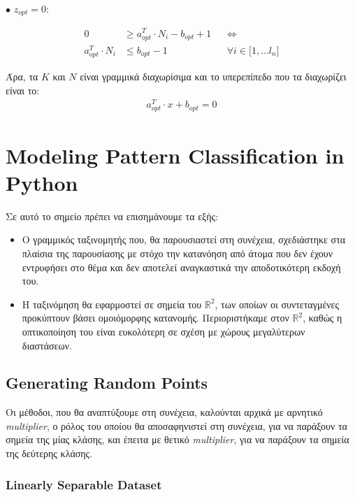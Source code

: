 \documentclass[12pt]{article}
\newcommand{\R}{\mathbb{R}}
\newcommand{\centered}[1]{\begin{align*}#1\end{align*}}
\begin{document}
\( \bullet \) \(z_{opt} = 0\):

\begin{align*}
0 & \geq a^{T}_{opt} \cdot N_{i} - b_{opt} + 1 && \Leftrightarrow \\ 
a^{T}_{opt} \cdot N_{i} & \leq b_{opt} - 1 && \forall i \in \lbrack 1, \dotsc l_n \rbrack
\end{align*} 

Άρα, τα \(K\) και \(N\) είναι γραμμικά διαχωρίσιμα και το υπερεπίπεδο που τα διαχωρίζει είναι το: \\

\centered{a^{T}_{opt} \cdot x + b_{opt} = 0}


\pagebreak

\section{Modeling Pattern Classification in Python}

Σε αυτό το σημείο πρέπει να επισημάνουμε τα εξής: \\

\begin{itemize}
    \item Ο γραμμικός ταξινομητής που, θα παρουσιαστεί στη συνέχεια,
    σχεδιάστηκε στα πλαίσια της παρουσίασης με στόχο την κατανόηση
    από άτομα που δεν έχουν εντρυφήσει στο θέμα και δεν αποτελεί αναγκαστικά
    την αποδοτικότερη εκδοχή του. \\

    \item Η ταξινόμηση θα εφαρμοστεί σε σημεία του \( \R^2 \),
    των οποίων οι συντεταγμένες προκύπτουν βάσει ομοιόμορφης κατανομής.
    Περιοριστήκαμε στον \( \R^2 \), καθώς η οπτικοποίηση του είναι ευκολότερη
    σε σχέση με χώρους μεγαλύτερων διαστάσεων. \\
\end{itemize}

\subsection{Generating Random Points}

Οι μέθοδοι, που θα αναπτύξουμε στη συνέχεια, καλούνται αρχικά με αρνητικό \textit{multiplier},
ο ρόλος του οποίου θα αποσαφηνιστεί στη συνέχεια,
για να παράξουν τα σημεία της μίας κλάσης, και έπειτα με θετικό \textit{multiplier},
για να παράξουν τα σημεία της δεύτερης κλάσης. \\

\subsubsection{Linearly Separable Dataset}
\end{document}

